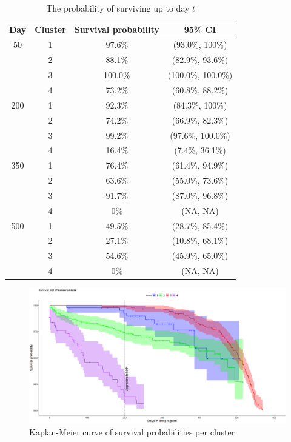\documentclass[12pt]{article}
\begin{document}
	\begin{table}[h]
		\begin{center}
			\begin{tabular}{|c|c|c|c|}
				\hline \textbf{Day} & \textbf{Cluster} & \textbf{Survival probability} & \textbf{95\% CI}\\
				\hline 50 & 1 & 97.6\% & (93.0\%, 100\%) \\
				\cline{2-4} & 2 & 88.1\% & (82.9\%, 93.6\%) \\
				\cline{2-4} & 3 & 100.0\% & (100.0\%, 100.0\%) \\
				\cline{2-4} & 4 & 73.2\% & (60.8\%, 88.2\%) \\
				\hline 200 & 1 & 92.3\% & (84.3\%, 100\%) \\
				\cline{2-4} & 2 & 74.2\% & (66.9\%, 82.3\%) \\
				\cline{2-4} & 3 & 99.2\% & (97.6\%, 100.0\%) \\
				\cline{2-4} & 4 & 16.4\% & (7.4\%, 36.1\%) \\
				\hline 350 & 1 & 76.4\% & (61.4\%, 94.9\%) \\
				\cline{2-4} & 2 & 63.6\% & (55.0\%, 73.6\%) \\
				\cline{2-4} & 3 & 91.7\% & (87.0\%, 96.8\%) \\
				\cline{2-4} & 4 & 0\% & (NA, NA) \\
				\hline 500 & 1 & 49.5\% & (28.7\%, 85.4\%) \\
				\cline{2-4} & 2 & 27.1\% & (10.8\%, 68.1\%) \\
				\cline{2-4} & 3 & 54.6\% & (45.9\%, 65.0\%) \\
				\cline{2-4} & 4 & 0\% & (NA, NA) \\
				\hline
			\end{tabular}
		\end{center}
		\label{table:surv_prob}
		\caption{The probability of surviving up to day $t$}
	\end{table}
	
	\begin{figure}[h]
		\begin{center}
			\includegraphics[width=150mm]{images/censored, birth.png}
			\caption{Kaplan-Meier curve of survival probabilities per cluster}
			\label{fig:cens_surv}
		\end{center}
	\end{figure}
\end{document}
